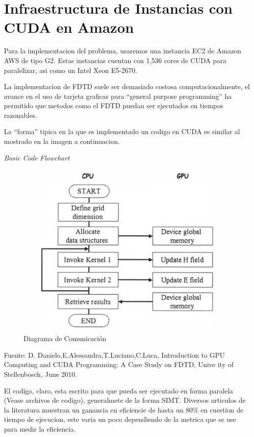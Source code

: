 \documentclass[]{article}
\begin{document}
\section{Infraestructura de Instancias con CUDA en
Amazon}\label{infraestructura-de-instancias-con-cuda-en-amazon}

Para la implementacion del problema, usaremos una instancia EC2 de
Amazon AWS de tipo G2. Estas instancias cuentan con 1,536 cores de CUDA
para paralelizar, asi como un Intel Xeon E5-2670.

La implementacion de FDTD suele ser demasiado costosa
computacionalmente, el avance en el uso de tarjeta graficas para
``general purpose programming'' ha permitido que metodos como el FDTD
puedan ser ejecutados en tiempos razonables.

La ``forma'' tipica en la que es implementado un codigo en CUDA es
similar al mostrado en la imagen a continuacion.

\emph{Basic Code Flowchart}

\begin{figure}
\centering
\includegraphics{img/flow.png}
\caption{Diagrama de Comunicación}
\end{figure}

Fuente: D. Danielo,E.Alessandra,T.Luciano,C.Luca, Introduction to GPU
Computing and CUDA Programming: A Case Study on FDTD, Unive ity of
Stellenbosch, June 2010.

El codigo, claro, esta escrito para que pueda ser ejecutado en forma
paralela (Vease archivos de codigo), generalmete de la forma SIMT.
Diversos articulos de la literatura muestran un ganancia en eficiencie
de hasta un 80\% en cuestion de tiempo de ejecucion, este varia un poco
dependiendo de la metrica que se use para medir la eficiencia.
\end{document}
